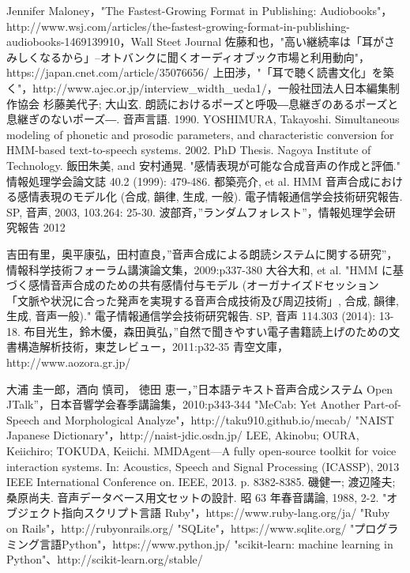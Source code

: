 \begin{thebibliography}{99}

 Jennifer Maloney，"The Fastest-Growing Format in Publishing: Audiobooks"，http://www.wsj.com/articles/the-fastest-growing-format-in-publishing-audiobooks-1469139910，Wall Steet Journal
 佐藤和也，"高い継続率は「耳がさみしくなるから」--オトバンクに聞くオーディオブック市場と利用動向"，https://japan.cnet.com/article/35076656/
 上田渉，"「耳で聴く読書文化」を築く"，http://www.ajec.or.jp/interview\_width\_ueda1/，一般社団法人日本編集制作協会
 杉藤美代子; 大山玄. 朗読におけるポーズと呼吸―息継ぎのあるポーズと息継ぎのないポーズ―. 音声言語. 1990.
 YOSHIMURA, Takayoshi. Simultaneous modeling of phonetic and prosodic parameters, and characteristic conversion for HMM-based text-to-speech systems. 2002. PhD Thesis. Nagoya Institute of Technology.
 飯田朱美, and 安村通晃. "感情表現が可能な合成音声の作成と評価." 情報処理学会論文誌 40.2 (1999): 479-486.
 都築亮介, et al. HMM 音声合成における感情表現のモデル化 (合成, 韻律, 生成, 一般). 電子情報通信学会技術研究報告. SP, 音声, 2003, 103.264: 25-30.
 波部斉，”ランダムフォレスト”，情報処理学会研究報告 2012

 吉田有里，奥平康弘，田村直良，”音声合成による朗読システムに関する研究”，情報科学技術フォーラム講演論文集，2009:p337-380
 大谷大和, et al. "HMM に基づく感情音声合成のための共有感情付与モデル (オーガナイズドセッション 「文脈や状況に合った発声を実現する音声合成技術及び周辺技術」, 合成, 韻律, 生成, 音声一般)." 電子情報通信学会技術研究報告. SP, 音声 114.303 (2014): 13-18.
 布目光生，鈴木優，森田眞弘，”自然で聞きやすい電子書籍読上げのための文書構造解析技術，東芝レビュー，2011:p32-35
 青空文庫，http://www.aozora.gr.jp/

 大浦 圭一郎，酒向 慎司， 徳田 恵一，”日本語テキスト音声合成システム Open JTalk”，日本音響学会春季講論集，2010:p343-344
 "MeCab: Yet Another Part-of-Speech and Morphological Analyze"，http://taku910.github.io/mecab/
 "NAIST Japanese Dictionary"，http://naist-jdic.osdn.jp/
 LEE, Akinobu; OURA, Keiichiro; TOKUDA, Keiichi. MMDAgent—A fully open-source toolkit for voice interaction systems. In: Acoustics, Speech and Signal Processing (ICASSP), 2013 IEEE International Conference on. IEEE, 2013. p. 8382-8385.
 磯健一; 渡辺隆夫; 桑原尚夫. 音声データベース用文セットの設計. 昭 63 年春音講論, 1988, 2-2.
 "オブジェクト指向スクリプト言語 Ruby"，https://www.ruby-lang.org/ja/
 "Ruby on Rails"，http://rubyonrails.org/
 "SQLite"，https://www.sqlite.org/
 "プログラミング言語Python"，https://www.python.jp/
 "scikit-learn: machine learning in Python"、http://scikit-learn.org/stable/

\end{thebibliography}
